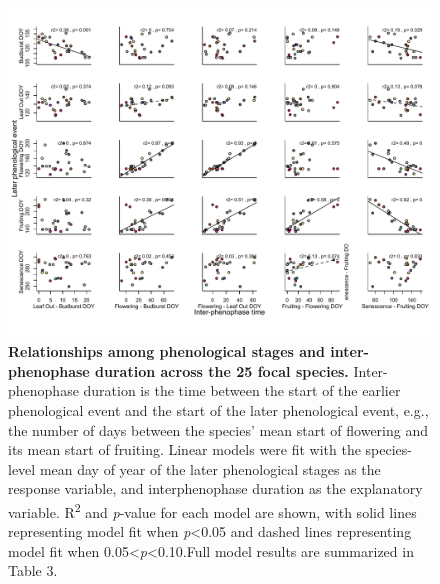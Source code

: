 \documentclass{article}
\begin{document}
\begin{figure}[h]
  \centering
  \includegraphics{../analyses/figures/adj_stagesmegaplot_col2.pdf}
  \caption{\textbf{Relationships among phenological stages and inter-phenophase duration across the 25 focal species.} Inter-phenophase duration is the time between the start of the earlier phenological event and the start of the later phenological event, e.g., the number of days between the species' mean start of flowering and its mean start of fruiting. Linear models were fit with the species-level mean day of year of the later phenological stages as the response variable, and interphenophase duration as the explanatory variable. R\textsuperscript{2} and \textit{p}-value for each model are shown, with solid lines representing model fit when \textit{p}<0.05 and dashed lines representing model fit when 0.05<\textit{p}<0.10.Full model results are summarized in Table 3.}
  \label{fig:inter}
   \end{figure}

\end{document}
